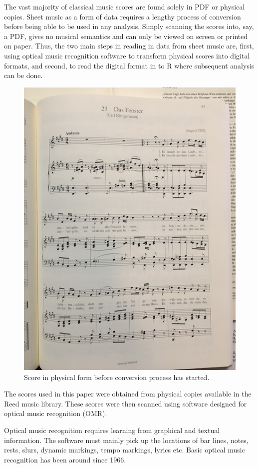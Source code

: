 \documentclass[12pt,twoside]{reedthesis}
\theoremstyle{definition}
\theoremstyle{definition}
\theoremstyle{definition}
\theoremstyle{remark}
\begin{document}
The vast majority of classical music scores are found solely in PDF or
physical copies. Sheet music as a form of data requires a lengthy
process of conversion before being able to be used in any analysis.
Simply scanning the scores into, say, a PDF, gives no musical semantics
and can only be viewed on screen or printed on paper. Thus, the two main
steps in reading in data from sheet music are, first, using optical
music recognition software to transform physical scores into digital
formats, and second, to read the digital format in to R where subsequent
analysis can be done.
\begin{figure}[h]
\centering
\includegraphics[scale=.50]{images/scorephoto.JPG}
\caption{Score in physical form before conversion process has started.}
\label{subd}
\end{figure}
The scores used in this paper were obtained from physical copies
available in the Reed music library. These scores were then scanned
using software designed for optical music recognition (OMR).

Optical music recognition requires learning from graphical and textual
information. The software must mainly pick up the locations of bar
lines, notes, rests, slurs, dynamic markings, tempo markings, lyrics
etc. Basic optical music recognition has been around since 1966.
\end{document}
